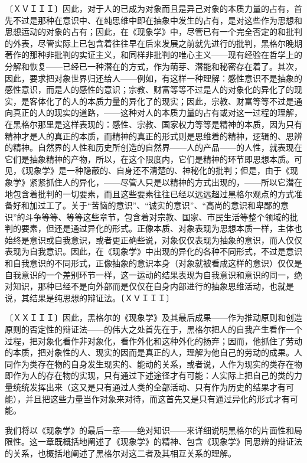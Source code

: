 \documentclass[a4paper,twoside,12pt,AutoFakeBold]{ctexart}
\begin{document}
〔ＸＶＩＩＩ〕因此，对于人的已成为对象而且是异己对象的本质力量的占有，首先不过是那种在意识中、在纯思维中即在抽象中发生的占有，是对这些作为思想和思想运动的对象的占有；因此，在《现象学》中，尽管已有一个完全否定的和批判的外表，尽管实际上已包含着往往早在后来发展之前就先进行的批判，黑格尔晚期著作的那种非批判的实证主义，和同样非批判的唯心主义——现有经验在哲学上的分解和恢复——已经已一种潜在的方式，作为萌芽、潜能和秘密存在着了。其次，因此，要求把对象世界归还给人——例如，有这样一种理解︰感性意识不是抽象的感性意识，而是人的感性的意识；宗教、财富等等不过是人的对象化的异化了的现实，是客体化了的人的本质力量的异化了的现实；因此，宗教、财富等等不过是通向真正的人的现实的道路，——这种对人的本质力量的占有或对这一过程的理解，在黑格尔那里是这样表现的：感性、宗教、国家权力等等是精神的本质，因为只有精神才是人的真正的本质，而精神的真正的形式则是思维着的精神，逻辑的、思辨的精神。自然界的人性和历史所创造的自然界——人的产品——的人性，就表现在它们是抽象精神的产物，所以，在这个限度内，它们是精神的环节即思想本质。可见，《现象学》是一种隐蔽的、自身还不清楚的、神秘化的批判；但是，由于《现象学》紧紧抓住人的异化，——尽管人只是以精神的方式出现的，——所以它潜在地包含着批判的一切要素，而且这些要素往往已经以远远超过黑格尔观点的方式准备好和加过工了。关于“苦恼的意识”、“诚实的意识”、“高尚的意识和卑鄙的意识”的斗争等等、等等这些章节，包含着对宗教、国家、市民生活等整个领域的批判的要素，但还是通过异化的形式。正像本质、对象表现为思想本质一样，主体也始终是意识或自我意识，或者更正确些说，对象仅仅表现为抽象的意识，而人仅仅表现为自我意识。因此，在《现象学》中出现的异化的各种不同形式，不过是意识和自我意识的不同形式，正像抽象的意识本身（对象就被看成这样的意识）仅仅是自我意识的一个差别环节一样，这一运动的结果表现为自我意识和意识的同一，绝对知识，那种已经不是向外部而是仅仅在自身内部进行的抽象思维活动，也就是说，其结果是纯思想的辩证法。〔ＸＶＩＩＩ〕

〔ＸＸＩＩＩ〕因此，黑格尔的《现象学》及其最后成果——作为推动原则和创造原则的否定性的辩证法——的伟大之处首先在于，黑格尔把人的自我产生看作一个过程，把对象化看作非对象化，看作外化和这种外化的扬弃；因而，他抓住了劳动的本质，把对象性的人、现实的因而是真正的人，理解为他自己的劳动的成果。人同作为类存在物的自身发生现实的、能动的关系，或者说，人作为现实的类存在物即作为人的存在物的实现，只有通过下述途径才有可能：人实际上把自己的类的力量统统发挥出来（这又是只有通过人类的全部活动、只有作为历史的结果才有可能），并且把这些力量当作对象来对待，而这首先又是只有通过异化的形式才有可能。

我们将以《现象学》的最后一章——绝对知识——来详细说明黑格尔的片面性和局限性。这一章既概括地阐述了《现象学》的精神、包含《现象学》同思辨的辩证法的关系，也概括地阐述了黑格尔对这二者及其相互关系的理解。
\end{document}
